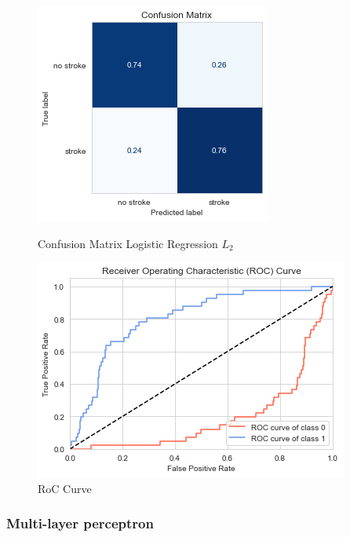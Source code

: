 \documentclass[11pt, a4paper]{article}
\begin{document}
\begin{figure}[H]
    \includegraphics[width=\textwidth]{images/logRegConfMat.png}
    \caption{Confusion Matrix Logistic Regression $L_2$}
    \label{fig:logRegConfMat}
\endminipage\hfill
{}
    \includegraphics[width=\textwidth]{images/rocLog.png}
    \caption{RoC Curve}
    \label{fig:RoCLog}
\endminipage\hfill
\end{figure}


\subsubsection{Multi-layer perceptron}
\end{document}

